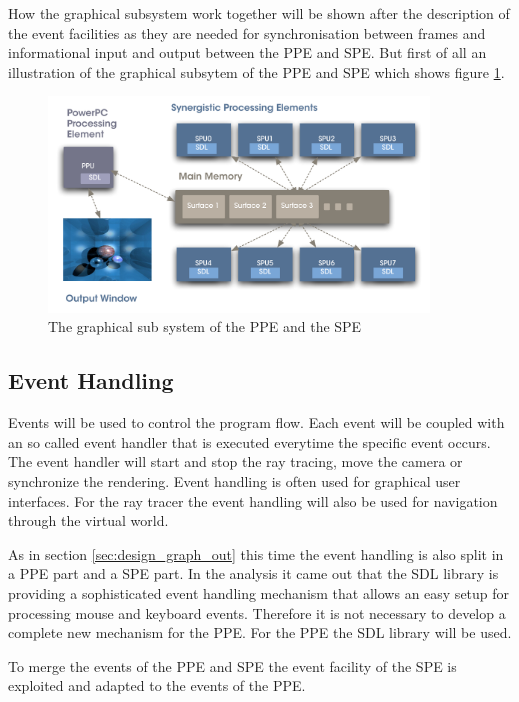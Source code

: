 \documentclass[DIV10, abstracton, openright, footsepline, headsepline, twoside, 9pt,
bigheadings]{scrreprt}
\begin{document}
How the graphical subsystem work together will be shown after the description
of the event facilities as they are needed for synchronisation between frames
and informational input and output between the PPE and SPE. But first of all
an illustration of the graphical subsytem of the PPE and SPE which shows figure
\ref{fig:graphical_subsystem}.

\begin{figure}[H]
\centering
\includegraphics[width=0.9\textwidth]{diagramme/graphical_subsystem}
\caption{The graphical sub system of the PPE and the SPE}
\label{fig:graphical_subsystem}
\end{figure}


\subsection{Event Handling}
\label{sec:design_event_handling}
Events will be used to control the program flow. Each event will be coupled
with an so called event handler that is executed everytime the specific event
occurs.  The event handler will start and stop the ray tracing, move the camera
or synchronize the rendering. Event handling is often used for graphical user
interfaces. For the ray tracer the event handling will also be used for navigation
through the virtual world.

As in section \ref{sec:design_graph_out} this time the event handling is also
split in a PPE part and a SPE part. In the analysis it came out that the SDL library
is providing a sophisticated event handling mechanism that allows an easy setup
for processing mouse and keyboard events. Therefore it is not necessary to develop
a complete new mechanism for the PPE. For the PPE the SDL library will be used.

To merge the events of the PPE and SPE the event facility of the SPE is exploited
and adapted to the events of the PPE.
\end{document}

